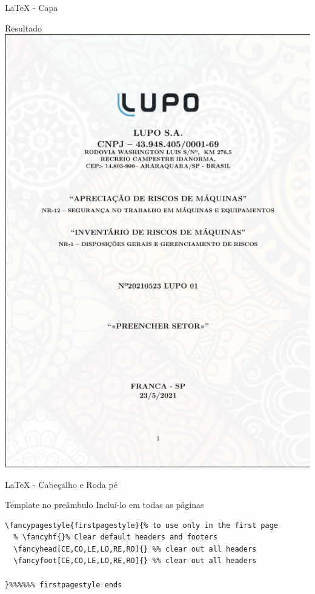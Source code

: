 \documentclass[bigger]{beamer}
\begin{document}
{\begin{frame}[label={sec:org3684232}]{\LaTeX{} - Capa}
\begin{block}{Resultado}
\centering
\href{img/capa.png}{\includegraphics[height=0.8\textheight]{./img/capa.png}}
\end{block}
\end{frame}

\begin{frame}[label={sec:orga4d3b47},fragile]{\LaTeX{} - Cabeçalho e Roda pé}
 \begin{block}{Template no preâmbulo}
Incluí-lo em todas as páginas

\begin{verbatim}
\fancypagestyle{firstpagestyle}{% to use only in the first page
  % \fancyhf{}% Clear default headers and footers
  \fancyhead[CE,CO,LE,LO,RE,RO]{} %% clear out all headers
  \fancyfoot[CE,CO,LE,LO,RE,RO]{} %% clear out all headers
  
}%%%%%% firstpagestyle ends
\end{verbatim}
\end{block}
\end{frame}

}
\end{document}
